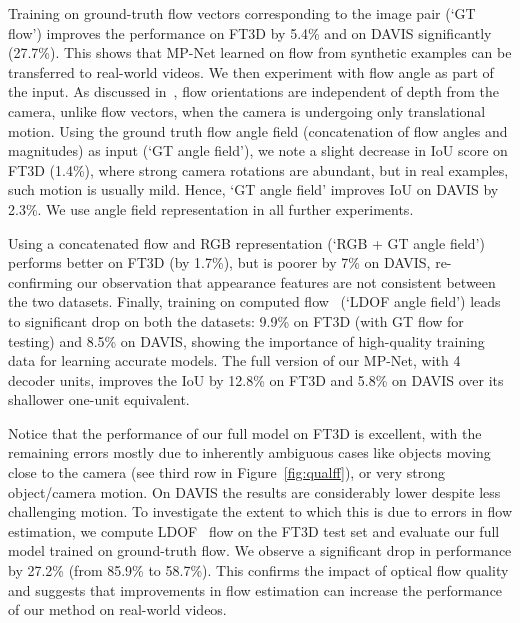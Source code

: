 \documentclass[10pt,twocolumn,letterpaper]{article}
\begin{document}
Training on ground-truth flow vectors corresponding to the image pair (`GT
flow') improves the performance on FT3D by 5.4\% and on DAVIS significantly
(27.7\%). This shows that MP-Net learned on flow from synthetic examples can be
transferred to real-world videos. We then experiment with flow angle as part of
the input. As discussed in~\cite{Narayana13}, flow orientations are independent
of depth from the camera, unlike flow vectors, when the camera is undergoing
only translational motion. Using the ground truth flow angle field (concatenation
of flow angles and magnitudes) as input (`GT angle field'), we note a slight
decrease in IoU score on FT3D (1.4\%), where strong camera rotations are
abundant, but in real examples, such motion is usually mild. Hence, `GT angle
field' improves IoU on DAVIS by 2.3\%. We use angle field representation in all
further experiments.

Using a concatenated flow and RGB representation (`RGB + GT angle field')
performs better on FT3D (by 1.7\%), but is poorer by 7\% on DAVIS,
re-confirming our observation that appearance features are not consistent
between the two datasets. Finally, training on computed flow~\cite{Brox11a}
(`LDOF angle field') leads to significant drop on both the datasets: 9.9\% on
FT3D (with GT flow for testing) and 8.5\% on DAVIS, showing the
importance of high-quality training data for learning accurate
models. The full version of our MP-Net, with 4 decoder units, improves
the IoU by 12.8\% on FT3D and 5.8\% on DAVIS over its shallower
one-unit equivalent.  

Notice that the performance of our full model on FT3D is excellent, with the
remaining errors mostly due to inherently ambiguous cases like objects moving
close to the camera (see third row in Figure~\ref{fig:qualff}), or very strong
object/camera motion. On DAVIS the results are considerably lower despite less
challenging motion. To investigate the extent to which this is due to errors
in flow estimation, we compute LDOF~\cite{Brox11a} flow on the FT3D test set
and evaluate our full model trained on ground-truth flow. We observe a
significant drop in performance by 27.2\% (from 85.9\% to 58.7\%). This
confirms the impact of optical flow quality and suggests that improvements in
flow estimation can increase the performance of our method on real-world
videos.

\vspace{-0.2cm}
\end{document}
